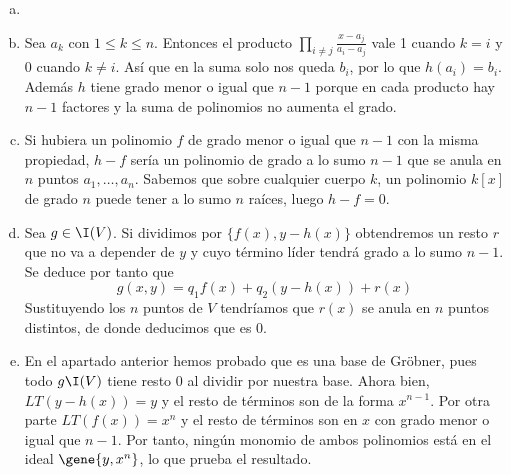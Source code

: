 \documentclass[twoside]{article}
\begin{document}
\begin{solucion}
\begin{enumerate}[a.]
\item[]
\item Sea $a_k$ con $1\leq k\leq n$. Entonces el producto $\prod_{i\neq j}
\frac{ x − a_j}{a_i − a_j}$ vale 1 cuando $k=i$ y 0 cuando $k\neq i$. Así que en la suma solo nos queda $b_i$, por lo que $h(a_i)=b_i$. Además $h$ tiene grado menor o igual que $n-1$ porque en cada producto hay $n-1$ factores y la suma de polinomios no aumenta el grado. 

\item Si hubiera un polinomio $f$ de grado menor o igual que $n-1$ con la misma propiedad, $h-f$ sería un polinomio de grado a lo sumo $n-1$ que se anula en $n$ puntos $a_1,\dots, a_n$. Sabemos que sobre cualquier cuerpo $k$, un polinomio $k[x]$ de grado $n$ puede tener a lo sumo $n$ raíces, luego $h-f=0$. 
\item Sea $g \in \I(V)$. Si dividimos por $\{f(x),y-h(x)\}$ obtendremos un resto $r$ que no va a depender de $y$ y cuyo término líder tendrá grado a lo sumo $n-1$. Se deduce por tanto que 
$$
g(x,y) = q_1f(x)+q_2(y-h(x)) + r(x)
$$
Sustituyendo los $n$ puntos de $V$ tendríamos que $r(x)$ se anula en $n$ puntos distintos, de donde deducimos que es $0$.
\item En el apartado anterior hemos probado que es una base de Gröbner, pues todo $g \I(V)$ tiene resto $0$ al dividir por nuestra base. Ahora bien, $LT(y-h(x)) = y$ y el resto de términos son de la forma $x^{n-1}$. Por otra parte $LT(f(x))=x^n$ y el resto de términos son en $x$ con grado menor o igual que $n-1$. Por tanto, ningún monomio de ambos polinomios está en el ideal $\gene{y,x^n}$, lo que prueba el resultado.
\end{enumerate}
\end{solucion}
\end{document}
